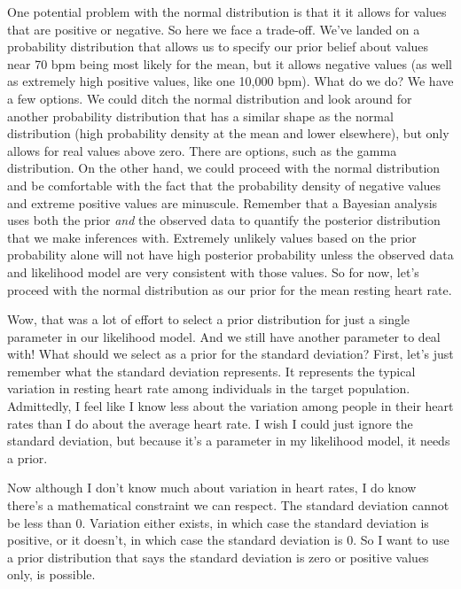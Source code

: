 \documentclass[
]{book}
\begin{document}
One potential problem with the normal distribution is that it it allows for values that are positive or negative. So here we face a trade-off. We've landed on a probability distribution that allows us to specify our prior belief about values near 70 bpm being most likely for the mean, but it allows negative values (as well as extremely high positive values, like one 10,000 bpm). What do we do? We have a few options. We could ditch the normal distribution and look around for another probability distribution that has a similar shape as the normal distribution (high probability density at the mean and lower elsewhere), but only allows for real values above zero. There are options, such as the gamma distribution. On the other hand, we could proceed with the normal distribution and be comfortable with the fact that the probability density of negative values and extreme positive values are minuscule. Remember that a Bayesian analysis uses both the prior \emph{and} the observed data to quantify the posterior distribution that we make inferences with. Extremely unlikely values based on the prior probability alone will not have high posterior probability unless the observed data and likelihood model are very consistent with those values. So for now, let's proceed with the normal distribution as our prior for the mean resting heart rate.

Wow, that was a lot of effort to select a prior distribution for just a single parameter in our likelihood model. And we still have another parameter to deal with! What should we select as a prior for the standard deviation? First, let's just remember what the standard deviation represents. It represents the typical variation in resting heart rate among individuals in the target population. Admittedly, I feel like I know less about the variation among people in their heart rates than I do about the average heart rate. I wish I could just ignore the standard deviation, but because it's a parameter in my likelihood model, it needs a prior.

Now although I don't know much about variation in heart rates, I do know there's a mathematical constraint we can respect. The standard deviation cannot be less than 0. Variation either exists, in which case the standard deviation is positive, or it doesn't, in which case the standard deviation is 0. So I want to use a prior distribution that says the standard deviation is zero or positive values only, is possible.
\end{document}
